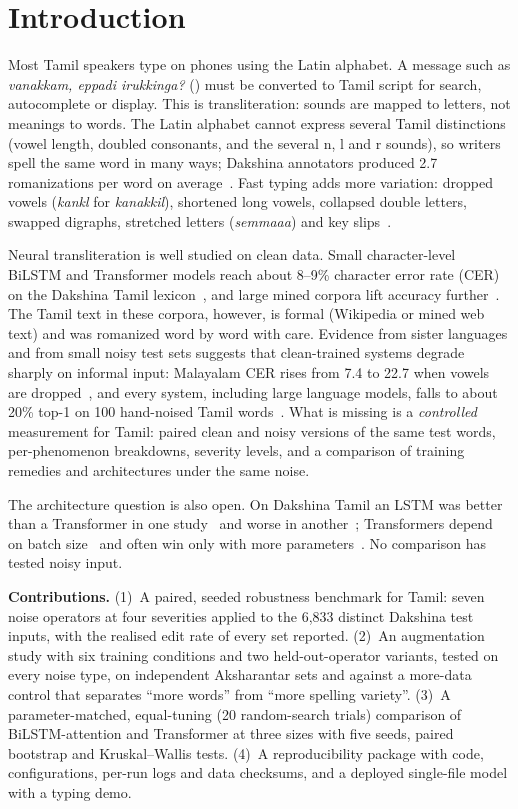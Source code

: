 \section{Introduction}
Most Tamil speakers type on phones using the Latin alphabet.
A message such as \emph{vanakkam, eppadi irukkinga?} () must be converted to Tamil script for search, autocomplete or display.
This is transliteration: sounds are mapped to letters, not meanings to words.
The Latin alphabet cannot express several Tamil distinctions (vowel length, doubled consonants, and the several n, l and r sounds), so writers spell the same word in many ways; Dakshina annotators produced 2.7 romanizations per word on average~\cite{roark2020dakshina}.
Fast typing adds more variation: dropped vowels (\emph{kankl} for \emph{kanakkil}), shortened long vowels, collapsed double letters, swapped digraphs, stretched letters (\emph{semmaaa}) and key slips~\cite{wolfsonkin2019latin,herath2024tamzhi}.

Neural transliteration is well studied on clean data.
Small character-level BiLSTM and Transformer models reach about 8--9\% character error rate (CER) on the Dakshina Tamil lexicon~\cite{roark2020dakshina,kirov2024context}, and large mined corpora lift accuracy further~\cite{madhani2023aksharantar}.
The Tamil text in these corpora, however, is formal (Wikipedia or mined web text) and was romanized word by word with care.
Evidence from sister languages and from small noisy test sets suggests that clean-trained systems degrade sharply on informal input: Malayalam CER rises from 7.4 to 22.7 when vowels are dropped~\cite{baiju2024malayalam}, and every system, including large language models, falls to about 20\% top-1 on 100 hand-noised Tamil words~\cite{azam2025beyond}.
What is missing is a \emph{controlled} measurement for Tamil: paired clean and noisy versions of the same test words, per-phenomenon breakdowns, severity levels, and a comparison of training remedies and architectures under the same noise.

The architecture question is also open.
On Dakshina Tamil an LSTM was better than a Transformer in one study~\cite{roark2020dakshina} and worse in another~\cite{kirov2024context}; Transformers depend on batch size~\cite{wu2021applying} and often win only with more parameters~\cite{moran2020effective}.
No comparison has tested noisy input.

\textbf{Contributions.}
(1)~A paired, seeded robustness benchmark for Tamil: seven noise operators at four severities applied to the 6{,}833 distinct Dakshina test inputs, with the realised edit rate of every set reported.
(2)~An augmentation study with six training conditions and two held-out-operator variants, tested on every noise type, on independent Aksharantar sets and against a more-data control that separates ``more words'' from ``more spelling variety''.
(3)~A parameter-matched, equal-tuning (20 random-search trials) comparison of BiLSTM-attention and Transformer at three sizes with five seeds, paired bootstrap and Kruskal--Wallis tests.
(4)~A reproducibility package with code, configurations, per-run logs and data checksums, and a deployed single-file model with a typing demo.

